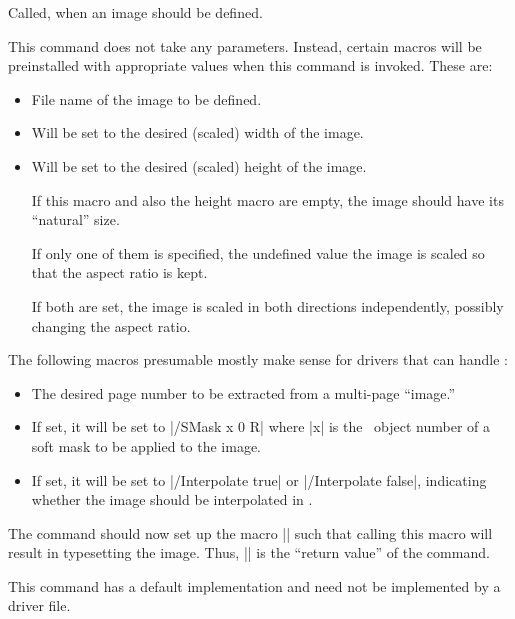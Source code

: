 \begin{command}{\pgfsys@defineimage}
  Called, when an image should be defined.

  This command does not take any parameters. Instead, certain macros
  will be preinstalled with appropriate values when this command is
  invoked. These are:

  \begin{itemize}
  \item\declare{|\pgf@filename|}
    File name of the image to be defined.

  \item\declare{|\pgf@imagewidth|}
    Will be set to the desired (scaled) width of the image.

  \item\declare{|\pgf@imageheight|}
    Will be set to the desired (scaled) height of the image.

    If this macro and also the height macro are empty, the image
    should have its ``natural'' size.

    If only one of them is specified, the undefined value the
    image is scaled so that the aspect ratio is kept.

    If both are set, the image is scaled in both directions
    independently, possibly changing the aspect ratio.
  \end{itemize}

  The following macros presumable mostly make sense for drivers that
  can handle \pdf:

  \begin{itemize}
  \item \declare{|\pgf@imagepage|}
    The desired page number to be extracted from a multi-page
    ``image.''

  \item\declare{|\pgf@imagemask|}
    If set, it will be set to |/SMask x 0 R| where |x| is the \pdf\
    object number of a soft mask to be applied to the image.

  \item\declare{|\pgf@imageinterpolate|}
    If set, it will be set to |/Interpolate true| or
    |/Interpolate false|, indicating whether the image should be
    interpolated in \pdf.
  \end{itemize}

  The command should now set up the macro |\pgf@image| such that calling
  this macro will result in typesetting the image. Thus, |\pgf@image| is
  the ``return value'' of the command.

  This command has a default implementation and need not be
  implemented by a driver file.
\end{command}



